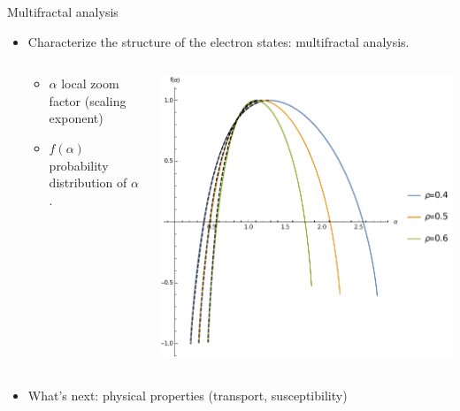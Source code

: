 \documentclass[xcolor=x11names,compress,professionalfonts]{beamer}
\renewcommand{\(}{\begin{columns}}
\renewcommand{\)}{\end{columns}}
\newcommand{\<}[1]{\begin{column}{#1}}
\renewcommand{\>}{\end{column}}
\begin{document}
\begin{frame}{Multifractal analysis}

\begin{itemize}
	\item Characterize the structure of the electron states: multifractal analysis.

	\begin{columns}
	\begin{column}{5cm}
	\begin{itemize}
		\item $\alpha$ local zoom factor (scaling exponent)
		\item $f(\alpha)$ probability distribution of $\alpha$.
	\end{itemize}
	
     \end{column}
    
    \begin{column}{5cm}
    {\centering
    	\includegraphics[scale=.5]{f-alpha_04_to_06.pdf}
    	
     }
    \end{column}
   \end{columns}
   \item What's next: physical properties (transport, susceptibility)
   \end{itemize}
\end{frame}
\end{document}
